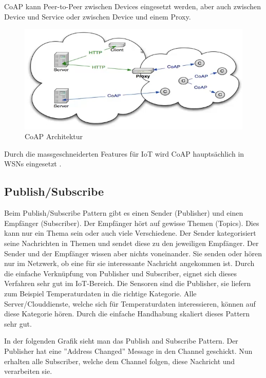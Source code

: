 CoAP kann Peer-to-Peer zwischen Devices eingesetzt werden, aber auch zwischen Device und Service oder zwischen Device und einem Proxy.
\begin{figure}[H]
\centering
\includegraphics[scale=0.8]{../02_Analyse/images/coap_architecture.png}
\caption{CoAP Architektur \cite{Shelby14}}
\end{figure}
  
Durch die massgeschneiderten Features für IoT wird CoAP hauptsächlich in WSNs eingesetzt \cite{Obermaier15}. 

\subsection{Publish/Subscribe}
Beim Publish/Subscribe Pattern gibt es einen Sender (Publisher) und einen Empfänger (Subscriber). Der Empfänger hört auf gewisse Themen (Topics). Dies kann nur ein Thema sein oder auch viele Verschiedene. Der Sender kategorisiert seine Nachrichten in Themen und sendet diese zu den jeweiligen Empfänger. Der Sender und der Empfänger wissen aber nichts voneinander. Sie senden oder hören nur im Netzwerk, ob eine für sie interessante Nachricht angekommen ist. Durch die einfache Verknüpfung von Publisher und Subscriber, eignet sich dieses Verfahren sehr gut im IoT-Bereich. Die Sensoren sind die Publisher, sie liefern zum Beispiel Temperaturdaten in die richtige Kategorie. Alle Server/Clouddienste, welche sich für Temperaturdaten interessieren, können auf diese Kategorie hören. Durch die einfache Handhabung skaliert dieses Pattern sehr gut.

In der folgenden Grafik sieht man das Publish and Subscribe Pattern. Der Publisher hat eine ''Address Changed'' Message in den Channel geschickt. Nun erhalten alle Subscriber, welche dem Channel folgen, diese Nachricht und verarbeiten sie.

